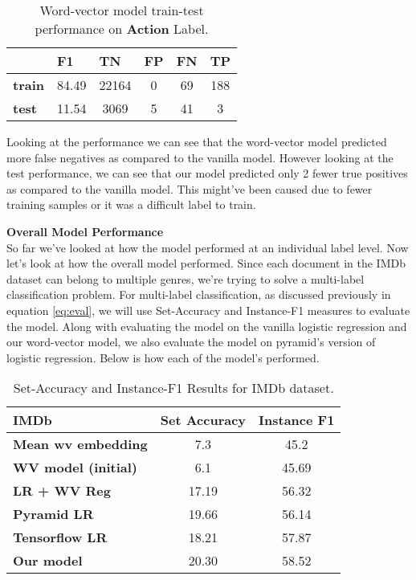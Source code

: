 \begin{table}[htbp]
\centering
\begin{tabular}{l|c|c|c|c|c|}
 & \multicolumn{1}{l|}{\textbf{F1}} & \multicolumn{1}{l|}{\textbf{TN}} & \multicolumn{1}{l|}{\textbf{FP}} & \multicolumn{1}{l|}{\textbf{FN}} & \multicolumn{1}{l|}{\textbf{TP}} \\ \hline
\textbf{train} & 84.49 & 22164 & 0 & 69 & 188 \\
\textbf{test} & 11.54 & 3069 & 5 & 41 & 3
\end{tabular}
\caption{\label{tab:widgets}Word-vector model train-test performance on \textbf{Action} Label.}
\end{table}

Looking at the performance we can see that the word-vector model predicted more false negatives as compared to the vanilla model. However looking at the test performance, we can see that  our model predicted only 2 fewer true positives as compared to the vanilla model. This might've been caused due to fewer training samples or it was a difficult label to train.

\newpage
\noindent \textbf{Overall Model Performance}\\

So far we've looked at how the model performed at an individual label level. Now let's look at how the overall model performed. Since each document in the IMDb dataset can belong to multiple genres, we're trying to solve a multi-label classification problem. For multi-label classification, as discussed previously in equation \ref{eq:eval}, we will use Set-Accuracy and Instance-F1 measures to evaluate the model. Along with evaluating the model on the vanilla logistic regression and our word-vector model, we also evaluate the model on pyramid's version of logistic regression. Below is how each of the model's performed.

\begin{table}[htbp]
\centering
\begin{tabular}{l|c|c}
IMDb & \textbf{Set Accuracy} & \textbf{Instance F1} \\ \hline
\textbf{Mean wv embedding} & 7.3 & 45.2 \\
\textbf{WV model (initial)} & 6.1 & 45.69 \\
\textbf{LR + WV Reg} & 17.19 & 56.32 \\
\textbf{Pyramid LR} & 19.66 & 56.14 \\
\textbf{Tensorflow LR} & 18.21 & 57.87 \\
\textbf{Our model} & 20.30 & 58.52
\end{tabular}
\caption{\label{tab:widgets}Set-Accuracy and Instance-F1 Results for IMDb dataset.}
\end{table}

